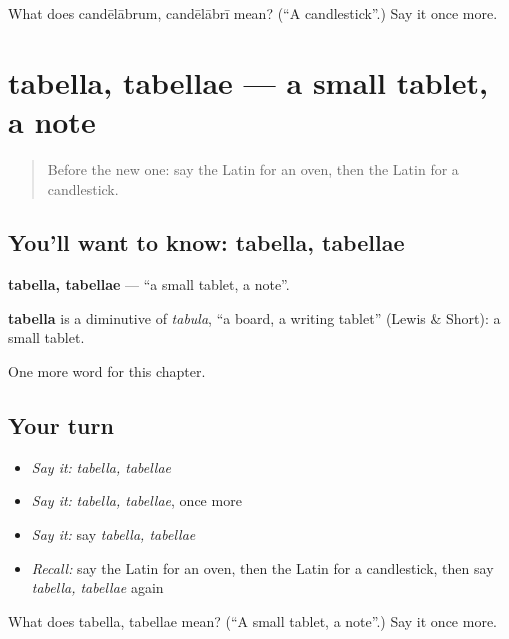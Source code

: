 \begin{tcolorbox}[breakable,colback=teal!4,colframe=teal!35!black,title={Before you move on}]
What does candēlābrum, candēlābrī mean? (\textquotedblleft{}A candlestick\textquotedblright{}.) Say it once more.
\end{tcolorbox}
\section[tabella, tabellae]{tabella, tabellae — a small tablet, a note}

\label{lesson:LA-C252-tabella}



\begin{quote}
Before the new one: say the Latin for an oven, then the Latin for a candlestick.
\end{quote}

\subsection*{You'll want to know: tabella, tabellae}
\textbf{tabella, tabellae} — \textquotedblleft{}a small tablet, a note\textquotedblright{}.

\begin{cousinweb}
\textbf{tabella} is a diminutive of \emph{tabula}, \textquotedblleft{}a board, a writing tablet\textquotedblright{} (Lewis \& Short): a small tablet.
\end{cousinweb}

\begin{grammarlens}[title={What you've built}]
One more word for this chapter.
\end{grammarlens}

\subsection*{Your turn}
\begin{itemize}
\raggedright
  \item \emph{Say it:} \emph{tabella, tabellae}
  \item \emph{Say it:} \emph{tabella, tabellae}, once more
  \item \emph{Say it:} say \emph{tabella, tabellae}
  \item \emph{Recall:} say the Latin for an oven, then the Latin for a candlestick, then say \emph{tabella, tabellae} again
\end{itemize}

\begin{tcolorbox}[breakable,colback=teal!4,colframe=teal!35!black,title={Before you move on}]
What does tabella, tabellae mean? (\textquotedblleft{}A small tablet, a note\textquotedblright{}.) Say it once more.
\end{tcolorbox}
